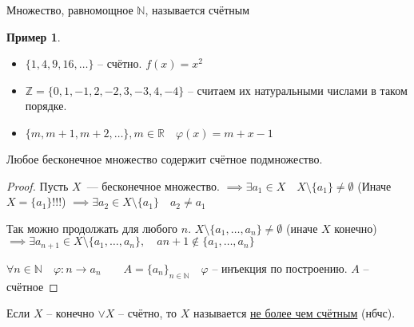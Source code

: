 \documentclass{book}
\newcommand\N{\ensuremath{\mathbb{N}}}
\newcommand\R{\ensuremath{\mathbb{R}}}
\newcommand\Z{\ensuremath{\mathbb{Z}}}
\renewcommand\O{\ensuremath{\emptyset}}
\renewcommand\phi{\varphi}
\theoremstyle{definition}
\newtheorem*{example}{Пример}
\begin{document}
    \begin{definition}
        Множество, равномощное $\N$, называется счётным
    \end{definition}
    \begin{example}
        \begin{itemize}
            \item $\{1, 4, 9, 16, \ldots\}$ -- счётно. 
            $f(x) = x^2$
            \item $\Z  = \{0,1,-1,2,-2,3,-3,4,-4\}$ -- считаем их натуральными числами  в таком порядке.
            \item $\{m, m+1, m+2, \ldots\}, m\in \R\quad \phi(x) = m+x-1$
        \end{itemize}
    \end{example}
    \begin{theorem}
        Любое бесконечное множество содержит счётное подмножество.
    \end{theorem}
    \begin{proof}
        Пусть $X$~--- бесконечное множество. $\implies  \exists a_1\in X\quad X\setminus \{a_1   \}\neq \O $ (Иначе $X = \{a_1\}$!!!) $\implies \exists a_2\in X\setminus \{a_1\}\quad a_2\neq a_1$

        Так можно продолжать для любого $n$. $X\setminus \{a_1, \ldots, a_n\}\neq \O $ (иначе $X$ конечно) $\implies \exists a_{n+1}\in X\setminus \{a_1, \ldots, a_n\}, \quad a{n+1}\not\in \{a_1, \ldots, a_n\}$

        $\forall n\in \N \quad \phi: n\to a_n\qquad A = \{a_n\}_{n\in \N }\quad \phi$ -- инъекция по построению. $A$ -- счётное
    \end{proof}

    \begin{definition}
        Если $X$ -- конечно $\vee X$ -- счётно, то $X$ называется \underline{не более чем счётным} (нбчс).
    \end{definition} 
\end{document}

